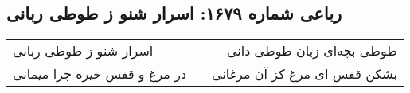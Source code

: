 \begin{center}
\section*{رباعی شماره ۱۶۷۹: اسرار شنو ز طوطی ربانی}
\label{sec:1679}
\begin{longtable}{l p{0.5cm} r}
اسرار شنو ز طوطی ربانی
&&
طوطی بچه‌ای زبان طوطی دانی
\\
در مرغ و قفس خیره چرا میمانی
&&
بشکن قفس ای مرغ کز آن مرغانی
\\
\end{longtable}
\end{center}
